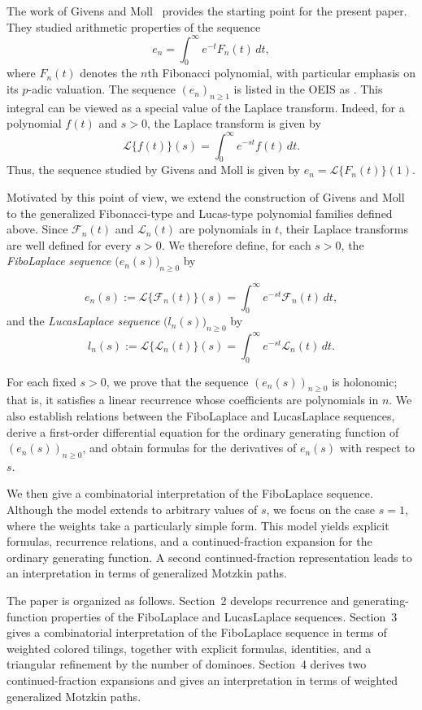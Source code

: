 \documentclass[11pt]{amsart}
\newcommand{\seqnum}[1]{\href{http://oeis.org/#1}{\underline{#1}}}
\newcommand{\Ft}[1]{\mathscr{F}_{#1}}
\newcommand{\Lt}[1]{\mathscr{L}_{#1}}
\theoremstyle{plain}
\numberwithin{equation}{section}
\begin{document}
The work of Givens and Moll~\cite{Givens} provides the starting point for the present paper. They studied arithmetic properties of the sequence \[ e_n=\int_0^\infty e^{-t}F_n(t)\,dt, \] where $F_n(t)$ denotes the $n$th Fibonacci polynomial, with particular emphasis on its $p$-adic valuation. The sequence $(e_n)_{n\geq 1}$ is listed in the OEIS as \cite[\seqnum{A362787}]{sloane}. This integral can be viewed as a special value of the Laplace transform. Indeed, for a polynomial $f(t)$ and $s>0$, the Laplace transform is given by 
\[ \mathcal{L}\{f(t)\}(s) = \int_0^\infty e^{-st}f(t)\,dt. \] Thus, the sequence studied by Givens and Moll is given by $e_n=\mathcal{L}\{F_n(t)\}(1)$.


Motivated by this point of view, we extend the construction of Givens and Moll to the generalized Fibonacci-type and Lucas-type polynomial families defined above. Since $\Ft{n}(t)$ and $\Lt{n}(t)$ are polynomials in $t$, their Laplace transforms are well defined for every $s>0$. We therefore define, for each $s>0$, the \emph{FiboLaplace sequence} $\bigl(e_n(s)\bigr)_{n\geq 0}$ by

\[
e_n(s):=\mathcal{L}\{\Ft{n}(t)\}(s)
=\int_0^\infty e^{-st}\Ft{n}(t)\,dt,
\]
and the \emph{LucasLaplace sequence} $\bigl(l_n(s)\bigr)_{n\geq 0}$ by
\[
l_n(s):=\mathcal{L}\{\Lt{n}(t)\}(s)
=\int_0^\infty e^{-st}\Lt{n}(t)\,dt.
\]

For each fixed $s>0$, we prove that the sequence $(e_n(s))_{n\geq 0}$ is holonomic; that is, it satisfies a linear recurrence whose coefficients are polynomials in $n$. We also establish relations between the FiboLaplace and LucasLaplace sequences, derive a first-order differential equation for the ordinary generating function of $(e_n(s))_{n\geq 0}$, and obtain formulas for the derivatives of $e_n(s)$ with respect to $s$. 

We then give a combinatorial interpretation of the FiboLaplace sequence. Although the model extends to arbitrary values of $s$, we focus on the case $s=1$, where the weights take a particularly simple form. This model yields explicit formulas, recurrence relations, and a continued-fraction expansion for the ordinary generating function. A second continued-fraction representation leads to an interpretation in terms of generalized Motzkin paths. 


The paper is organized as follows. Section~2 develops recurrence and
generating-function properties of the FiboLaplace and LucasLaplace
sequences. Section~3 gives a combinatorial interpretation of the
FiboLaplace sequence in terms of weighted colored tilings, together
with explicit formulas, identities, and a triangular refinement by the
number of dominoes. Section~4 derives two continued-fraction expansions and 
gives an interpretation in terms of weighted generalized Motzkin paths.
\end{document}
